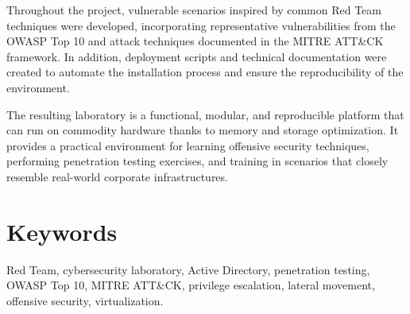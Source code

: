 Throughout the project, vulnerable scenarios inspired by common Red Team techniques were developed, incorporating representative vulnerabilities from the OWASP Top 10 and attack techniques documented in the MITRE ATT\&CK framework. In addition, deployment scripts and technical documentation were created to automate the installation process and ensure the reproducibility of the environment.

The resulting laboratory is a functional, modular, and reproducible platform that can run on commodity hardware thanks to memory and storage optimization. It provides a practical environment for learning offensive security techniques, performing penetration testing exercises, and training in scenarios that closely resemble real-world corporate infrastructures.




\vfill
\vspace{1.7cm}
\section*{Keywords}
\label{sec:keywords}
Red Team, cybersecurity laboratory, Active Directory, penetration testing, OWASP Top 10, MITRE ATT\&CK, privilege escalation, lateral movement, offensive security, virtualization.
\vfill
\vfill
\vfill
\vfill 